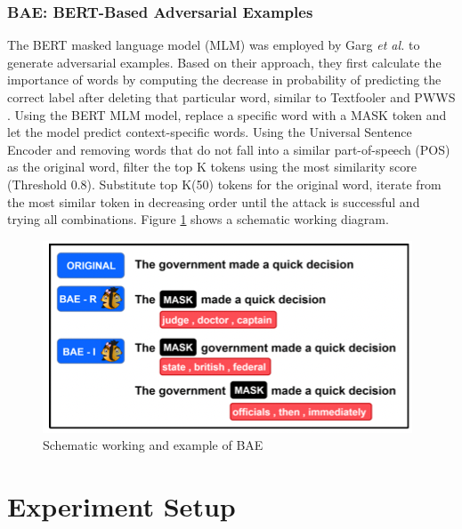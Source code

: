 \documentclass[%
	BCOR=8mm, %
	DIV=12,
	toc=bibliography, %
	toc=listof, %
	oneside, %
	egregdoesnotlikesansseriftitles, %
	]{scrbook}
\begin{document}
\subsection{BAE: BERT-Based Adversarial Examples}
\label{subsection:bae}
The BERT masked language model (MLM) was employed by Garg \textit{et al.} \cite{garg_bae_2020}  to generate adversarial examples. Based on their approach, they first calculate the importance of words by computing the decrease in probability of predicting the correct label after deleting that particular word, similar to Textfooler \cite{jia_certified_2019}  and PWWS \cite{ren_generating_2019}. Using the BERT MLM model, replace a specific word with a MASK token and let the model predict context-specific words. Using the Universal Sentence Encoder \cite{cer_universal_2018} and removing words that do not fall into a similar part-of-speech (POS) as the original word, filter the top K tokens using the most similarity score (Threshold 0.8). Substitute top K(50) tokens for the original word, iterate from the most similar token in decreasing order until the attack is successful and trying all combinations. Figure \ref{diag:baeexp} shows a schematic working diagram.
\begin{figure}[H]
    \centering
    \includegraphics[width=.65\textwidth]{img/BAEexample.png}
    \caption[Schematic working and example of BAE attack recipe]{Schematic working and example of BAE \cite{garg_bae_2020} }
    \label{diag:baeexp}
\end{figure}
 
\chapter{Experiment Setup}
\label{chapter:experiment}
\end{document}
